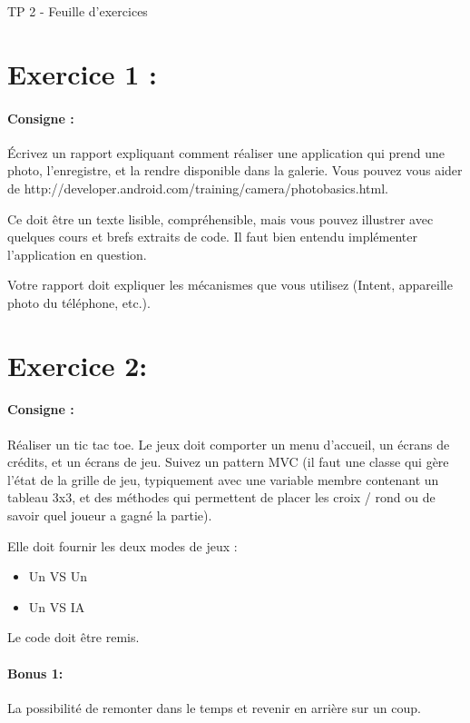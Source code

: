 \documentclass{article}
\begin{document}
\begin{center}
\large\sc TP 2 - Feuille d'exercices
\end{center}

\section{Exercice 1 :} 

\paragraph{Consigne : } Écrivez un rapport expliquant comment réaliser une application qui prend une photo, l'enregistre, et la rendre disponible dans la galerie. Vous pouvez vous aider de http://developer.android.com/training/camera/photobasics.html.

Ce doit être un texte lisible, compréhensible, mais vous pouvez illustrer avec quelques cours et brefs extraits de code.
Il faut bien entendu implémenter l'application en question.

Votre rapport doit expliquer les mécanismes que vous utilisez (Intent, appareille photo du téléphone, etc.).


\section{Exercice 2:}
\paragraph{Consigne :} Réaliser un tic tac toe. Le jeux doit comporter un menu d’accueil, un écrans de crédits, et un écrans de jeu. Suivez un pattern MVC (il faut une classe qui gère l'état de la grille de jeu, typiquement avec une variable membre contenant un tableau 3x3, et des méthodes qui permettent de placer les croix / rond ou de savoir quel joueur a gagné la partie).

Elle doit fournir les deux modes de jeux :
\begin{itemize}
\item Un VS Un
\item Un VS IA
\end{itemize}

Le code doit être remis.


\paragraph{Bonus 1:} La possibilité de remonter dans le temps et revenir en arrière sur un coup.
\end{document}
